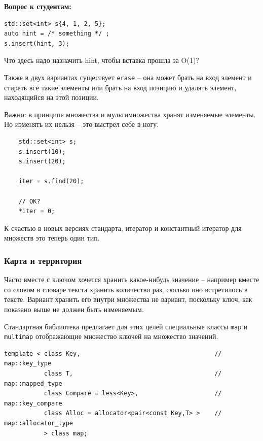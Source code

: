 \documentclass[a4paper,12pt,oneside]{article}
\newif\ifanswers
\begin{document}
\textbf{Вопрос к студентам:}

\begin{lstlisting}
std::set<int> s{4, 1, 2, 5};
auto hint = /* something */ ;
s.insert(hint, 3);
\end{lstlisting}

Что здесь надо назначить hint, чтобы вставка прошла за O(1)?

\ifanswers
Верный ответ: \lstinline!s.upper_bound(3)!
\fi

Также в двух вариантах существует \lstinline!erase! -- она может брать на вход элемент и стирать все такие элементы или брать на вход позицию и удалять элемент, находящийся на этой позиции.

Важно: в принципе множества и мультимножества хранят изменяемые элементы. Но изменять их нельзя -- это выстрел себе в ногу.

\begin{lstlisting}
    std::set<int> s;
    s.insert(10);
    s.insert(20);

    iter = s.find(20);

    // OK?
    *iter = 0;
\end{lstlisting}

К счастью в новых версиях стандарта, итератор и константный итератор для множеств это теперь один тип.

\subsubsection{Карта и территория}

Часто вместе с ключом хочется хранить какое-нибудь значение -- например вместе со словом в словаре текста хранить количество раз, сколько оно встретилось в тексте. Вариант хранить его внутри множества не вариант, поскольку ключ, как показано выше не должен быть изменяемым.

Стандартная библиотека предлагает для этих целей специальные классы \lstinline!map! и \lstinline!multimap! отображающие множество ключей на множество значений.

\begin{lstlisting}
template < class Key,                                     // map::key_type
           class T,                                       // map::mapped_type
           class Compare = less<Key>,                     // map::key_compare
           class Alloc = allocator<pair<const Key,T> >    // map::allocator_type
           > class map;
\end{lstlisting}
\end{document}
